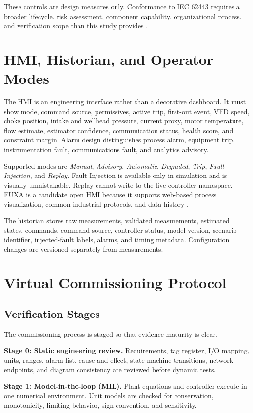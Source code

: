 \documentclass[conference]{IEEEtran}
\begin{document}
These controls are design measures only. Conformance to IEC 62443 requires a broader lifecycle, risk assessment, component capability, organizational process, and verification scope than this study provides \cite{iec62443}.

\section{HMI, Historian, and Operator Modes}
The HMI is an engineering interface rather than a decorative dashboard. It must show mode, command source, permissives, active trip, first-out event, VFD speed, choke position, intake and wellhead pressure, current proxy, motor temperature, flow estimate, estimator confidence, communication status, health score, and constraint margin. Alarm design distinguishes process alarm, equipment trip, instrumentation fault, communications fault, and analytics advisory.

Supported modes are \emph{Manual}, \emph{Advisory}, \emph{Automatic}, \emph{Degraded}, \emph{Trip}, \emph{Fault Injection}, and \emph{Replay}. Fault Injection is available only in simulation and is visually unmistakable. Replay cannot write to the live controller namespace. FUXA is a candidate open HMI because it supports web-based process visualization, common industrial protocols, and data history \cite{fuxa}.

The historian stores raw measurements, validated measurements, estimated states, commands, command source, controller status, model version, scenario identifier, injected-fault labels, alarms, and timing metadata. Configuration changes are versioned separately from measurements.

\section{Virtual Commissioning Protocol}
\subsection{Verification Stages}
The commissioning process is staged so that evidence maturity is clear.

\textbf{Stage 0: Static engineering review.} Requirements, tag register, I/O mapping, units, ranges, alarm list, cause-and-effect, state-machine transitions, network endpoints, and diagram consistency are reviewed before dynamic tests.

\textbf{Stage 1: Model-in-the-loop (MIL).} Plant equations and controller execute in one numerical environment. Unit models are checked for conservation, monotonicity, limiting behavior, sign convention, and sensitivity.
\end{document}
